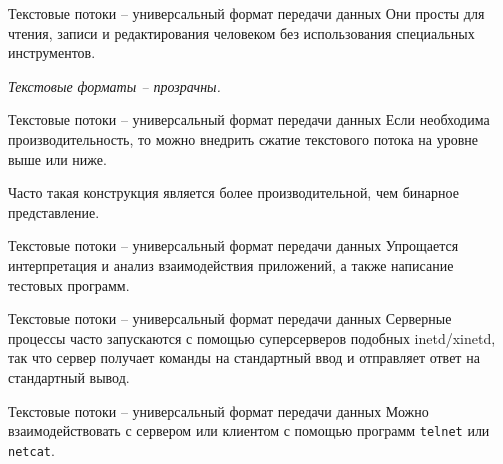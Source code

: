 \begin{frame}{Текстовые потоки -- универсальный формат передачи данных}
	Они просты для чтения,  записи и редактирования человеком без использования специальных инструментов.
	\pause

	{\itshape Текстовые форматы -- прозрачны.}
\end{frame}

\begin{frame}{Текстовые потоки -- универсальный формат передачи данных}
	Если необходима производительность,  то можно внедрить сжатие текстового потока на уровне выше или ниже.

	Часто такая конструкция является более производительной,  чем бинарное представление.
\end{frame}

\begin{frame}{Текстовые потоки -- универсальный формат передачи данных}
	Упрощается интерпретация и анализ взаимодействия приложений,  а также написание тестовых программ.
\end{frame}

\begin{frame}{Текстовые потоки -- универсальный формат передачи данных}
	Серверные процессы часто запускаются с помощью суперсерверов подобных inetd/xinetd,  так что сервер получает команды на стандартный ввод и отправляет ответ на стандартный вывод.
\end{frame}

\begin{frame}{Текстовые потоки -- универсальный формат передачи данных}
	Можно взаимодействовать с сервером или клиентом с помощью программ {\tt telnet} или {\tt netcat}.
\end{frame}

